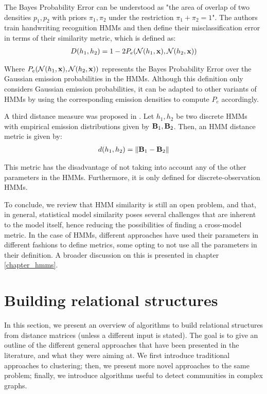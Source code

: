 \documentclass[../main.tex]{subfiles} \label{chapter_soa}
\begin{document}
\par The Bayes Probability Error can be understood as "the area of overlap of two densities $p_1, p_2$ with priors $\pi_1, \pi_2$ under the restriction $\pi_1+\pi_2 = 1$". The authors train handwriting recognition HMMs and then define their misclassification error in terms of their similarity metric, which is defined as:
\begin{align*}
D(h_1, h_2) = 1 - 2P_e{(\mathcal{N}(h_1, \mathbf{x}), \mathcal{N}(h_2, \mathbf{x}))}
\end{align*}
\par Where $P_e{(\mathcal{N}(h_1, \mathbf{x}), \mathcal{N}(h_2, \mathbf{x}))}$ represents the Bayes Probability Error over the Gaussian emission probabilities in the HMMs. Although this definition only considers Gaussian emission probabilities, it can be adapted to other variants of HMMs by using the corresponding emission densities to compute $P_e$ accordingly.
\par A third distance measure was proposed in \cite{Juang1985}. Let $h_1, h_2$ be two discrete HMMs with empirical emission distributions given by $\mathbf{B}_1, \mathbf{B}_2$. Then, an HMM distance metric is given by:
\begin{align*}
d(h_1, h_2) = \left\lVert\mathbf{B}_1 - \mathbf{B}_2\right\rVert
\end{align*}
\par This metric has the disadvantage of not taking into account any of the other parameters in the HMMs. Furthermore, it is only defined for discrete-observation HMMs.
\par To conclude, we review that HMM similarity is still an open problem, and that, in general, statistical model similarity poses several challenges that are inherent to the model itself, hence reducing the possibilities of finding a cross-model metric. In the case of HMMs, different approaches have used their parameters in different fashions to define metrics, some opting to not use all the parameters in their definition. A broader discussion on this is presented in chapter \ref{chapter_hmms}.

\section{Building relational structures}\label{algorithms_review}
In this section, we present an overview of algorithms to build relational structures from distance matrices (unless a different input is stated). The goal is to give an outline of the different general approaches that have been presented in the literature, and what they were aiming at. We first introduce traditional approaches to clustering; then, we present more novel approaches to the same problem; finally, we introduce algorithms useful to detect communities in complex graphs.
\end{document}
